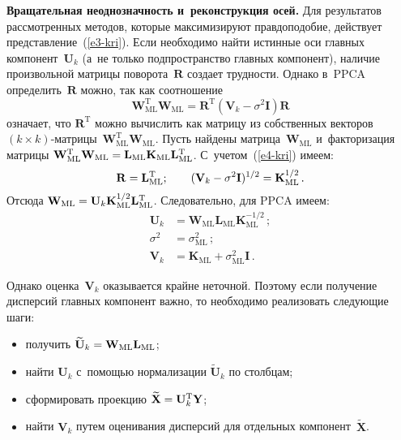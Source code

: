 \begin{multicols}{2}
     \textbf{Вращательная неоднозначность и~реконструкция осей.} Для 
результатов рассмотренных методов, которые максимизируют правдоподобие, 
действует представление~(\ref{e3-kri}). Если необходимо найти истинные оси 
главных компонент~$\mathbf{U}_k$ (а~не только подпространство главных 
компонент), наличие произвольной матрицы поворота~$\mathbf{R}$ создает 
трудности. Однако в~PPCA определить~$\mathbf{R}$ можно, так как  
соотношение
     \begin{equation}
     \mathbf{W}_{\mathrm{ML}}^{\mathrm{T}} \mathbf{W}_{\mathrm{ML}} 
=\mathbf{R}^{\mathrm{T}}\left(\mathbf{V}_k-\sigma^2\mathbf{I}\right) 
\mathbf{R}
     \label{e4-kri}
     \end{equation}
означает, что $\mathbf{R}^{\mathrm{T}}$ можно вычислить как матрицу из 
собственных векторов $(k\times k)$-мат\-ри\-цы~$\mathbf{W}_{\mathrm{ML}}^{\mathrm{T}} 
\mathbf{W}_{\mathrm{ML}}$. Пусть найдены 
матрица~$\mathbf{W}_{\mathrm{ML}}$ и~факторизация мат\-ри\-цы 
$\mathbf{W}_{\mathrm{ML}}^{\mathrm{T}} \mathbf{W}_{\mathrm{ML}}\hm= \mathbf{L}_{\mathrm{ML}} 
\mathbf{K}_{\mathrm{ML}}\mathbf{L}_{\mathrm{ML}}^{\mathrm{T}}$. С~учетом~(\ref{e4-kri}) 
имеем: 
$$
\mathbf{R}= \mathbf{L}_{\mathrm{ML}}^{\mathrm{T}};\qquad
(\mathbf{V}_k\hm- \sigma^2\mathbf{I})^{1/2}\hm= \mathbf{K}_{\mathrm{ML}}^{1/2}\,. 
$$
Отсюда $\mathbf{W}_{\mathrm{ML}}\hm= \mathbf{U}_k \mathbf{K}_{\mathrm{ML}}^{1/2} 
\mathbf{L}_{\mathrm{ML}}^{\mathrm{T}}$. Следовательно, для PPCA имеем:
\begin{align*}
\mathbf{U}_k &= \mathbf{W}_{\mathrm{ML}} \mathbf{L}_{\mathrm{ML}}  
\mathbf{K}_{\mathrm{ML}}^{-1/2}\,;\\
\sigma^2 &= \sigma^2_{\mathrm{ML}}\,;\\
\mathbf{V}_k &= \mathbf{K}_{\mathrm{ML}} +\sigma^2_{\mathrm{ML}} \mathbf{I}\,.
\end{align*}

     Однако оценка~$\mathbf{V}_k$ оказывается крайне неточной. Поэтому 
если получение дисперсий главных компонент важно, то необходимо 
реализовать следующие шаги:
     \begin{itemize}
\item получить $\widetilde{\mathbf{U}}_k\hm= \mathbf{W}_{\mathrm{ML}} 
\mathbf{L}_{\mathrm{ML}}$;
\item найти $\mathbf{U}_k$ с~помощью нормализации 
$\widetilde{\mathbf{U}}_k$ по столбцам;
\item сформировать проекцию $\widetilde{\mathbf{X}}\hm= 
\mathbf{U}_k^{\mathrm{T}} \mathbf{Y}$;
\item найти $\mathbf{V}_k$ путем оценивания дисперсий для отдельных 
компонент~$\widetilde{\mathbf{X}}$.
\end{itemize}


\end{multicols}
